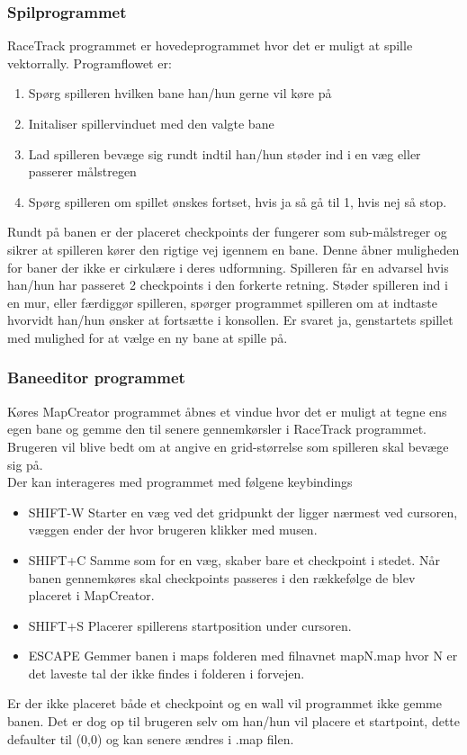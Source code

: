 \subsubsection{Spilprogrammet}
RaceTrack programmet er hovedeprogrammet hvor det er muligt at spille vektorrally. Programflowet er:
\begin{enumerate}
\item Spørg spilleren hvilken bane han/hun gerne vil køre på
\item Initaliser spillervinduet med den valgte bane 
\item Lad spilleren bevæge sig rundt indtil han/hun støder ind i en væg eller passerer målstregen
\item Spørg spilleren om spillet ønskes fortset, hvis ja så gå til 1, hvis nej så stop.
\end{enumerate}
Rundt på banen er der placeret checkpoints der fungerer som sub-målstreger og sikrer at spilleren kører den rigtige vej igennem en bane. Denne åbner muligheden for baner der ikke er cirkulære i deres udformning. Spilleren får en advarsel hvis han/hun har passeret 2 checkpoints i den forkerte retning.
Støder spilleren ind i en mur, eller færdiggør spilleren, spørger programmet spilleren om at indtaste hvorvidt han/hun ønsker at fortsætte i konsollen. Er svaret ja, genstartets spillet med mulighed for at vælge en ny bane at spille på.

\subsubsection{Baneeditor programmet}
Køres MapCreator programmet åbnes et vindue hvor det er muligt at tegne ens egen bane og gemme den til senere gennemkørsler i RaceTrack programmet. Brugeren vil blive bedt om at angive en grid-størrelse som spilleren skal bevæge sig på. \\
Der kan interageres med programmet med følgene keybindings
\begin{itemize}
\item SHIFT-W Starter en væg ved det gridpunkt der ligger nærmest ved cursoren, væggen ender der hvor brugeren klikker med musen.
\item SHIFT+C Samme som for en væg, skaber bare et checkpoint i stedet. Når banen gennemkøres skal checkpoints passeres i den rækkefølge de blev placeret i MapCreator.
\item SHIFT+S Placerer spillerens startposition under cursoren.
\item ESCAPE Gemmer banen i maps folderen med filnavnet mapN.map hvor N er det laveste tal der ikke findes i folderen i forvejen.
\end{itemize}
Er der ikke placeret både et checkpoint og en wall vil programmet ikke gemme banen. Det er dog op til brugeren selv om han/hun vil placere et startpoint, dette defaulter til (0,0) og kan senere ændres i .map filen.

